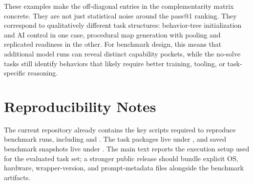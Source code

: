 \documentclass[11pt]{article}
\begin{document}
These examples make the off-diagonal entries in the complementarity matrix concrete. They are not just statistical noise around the pass@1 ranking. They correspond to qualitatively different task structures: behavior-tree initialization and AI control in one case, procedural map generation with pooling and replicated readiness in the other. For benchmark design, this means that additional model runs can reveal distinct capability pockets, while the no-solve tasks still identify behaviors that likely require better training, tooling, or task-specific reasoning.

\section{Reproducibility Notes}
The current repository already contains the key scripts required to reproduce benchmark runs, including
 and
.
The task packages live under , and saved benchmark snapshots live under
.
The main text reports the execution setup used for the evaluated task set; a stronger public release should bundle explicit OS, hardware, wrapper-version, and prompt-metadata files alongside the benchmark artifacts.
\end{document}

